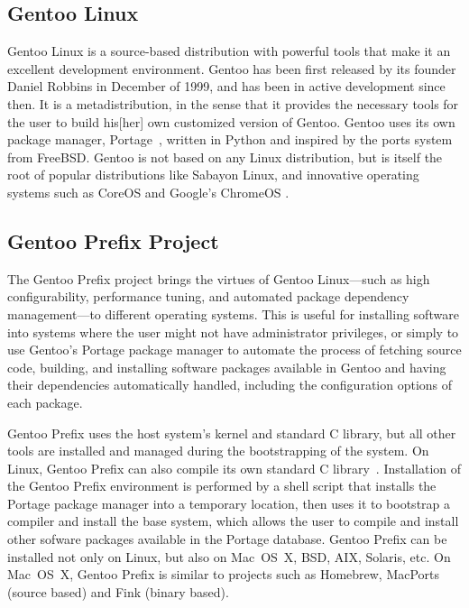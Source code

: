 \documentclass[a4paper,conference]{IEEEtran}
\begin{document}
\subsection{Gentoo Linux}

Gentoo Linux \cite{gentoo} is a source-based distribution with powerful
tools that make it an excellent development environment. Gentoo has been
first released by its founder Daniel Robbins in December of 1999, and
has been in active development since then. It is a metadistribution, in
the sense that it provides the necessary tools for the user to build
his[her] own customized version of Gentoo. Gentoo uses its own package
manager, Portage~\cite{gentoo:portage}, written in Python and inspired
by the ports system from FreeBSD. Gentoo is not based on any Linux
distribution, but is itself the root of popular distributions like
Sabayon Linux, and innovative operating systems such as
CoreOS \cite{coreos} and Google's ChromeOS \cite{chromiumos}.

\subsection{Gentoo Prefix Project}
\label{sec:portage}

The Gentoo Prefix project \cite{gentoo:prefix} brings the virtues of
Gentoo Linux---such as high configurability, performance tuning, and
automated package dependency management---to different operating
systems. This is useful for installing software into systems where the
user might not have administrator privileges, or simply to use Gentoo's
Portage package manager to automate the process of fetching source code,
building, and installing software packages available in Gentoo and
having their dependencies automatically handled, including the
configuration options of each package.

Gentoo Prefix uses the host system's kernel and standard C library, but
all other tools are installed and managed during the bootstrapping of
the system. On Linux, Gentoo Prefix can also compile its own standard C
library~\cite{gentoo:rap}. Installation of the Gentoo Prefix environment
is performed by a shell script that installs the Portage package manager
into a temporary location, then uses it to bootstrap a compiler and
install the base system, which allows the user to compile and install
other sofware packages available in the Portage database. Gentoo Prefix
can be installed not only on Linux, but also on Mac~OS~X, BSD, AIX,
Solaris, etc. On Mac~OS~X, Gentoo Prefix is similar to projects
such as Homebrew, MacPorts (source based) and Fink (binary based).
\end{document}
